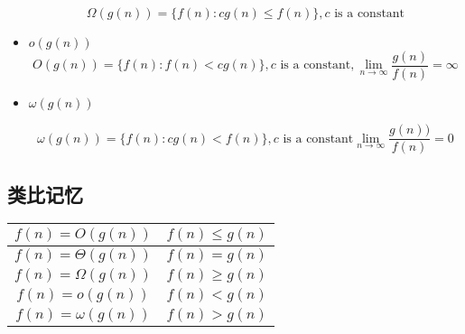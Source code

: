 \documentclass[11pt]{article}
\begin{document}
\begin{CJK}{UTF8}{gbsn}
\begin{itemize}
  \begin{displaymath}
    \Omega(g(n))=\{f(n):cg(n)\leqslant f(n) \},c\mbox{ is a constant}
  \end{displaymath}
  
\item $o(g(n))$
  \begin{displaymath}
    O(g(n))=\{f(n): f(n) < c g(n)\},c\mbox{ is a constant}, \lim_{n\rightarrow \infty} \frac{g(n)}{f(n)}=\infty
  \end{displaymath}

  \item $\omega(g(n))$

  \begin{displaymath}
    \omega(g(n))=\{f(n):cg(n)< f(n) \},c\mbox{ is a constant} \lim_{n\rightarrow \infty} \frac{g(n))}{f(n)}=0
  \end{displaymath}
  
\end{itemize}

\subsection{类比记忆}


\begin{center}
  \begin{tabular}{|c|c|}
    \hline
    $f(n)=O(g(n))$ & $f(n)\leqslant g(n)$  \\\hline
    $f(n)=\Theta(g(n))$ & $f(n) = g(n)$  \\\hline
    $f(n)=\Omega(g(n))$ & $f(n) \geqslant  g(n)$  \\\hline
    $f(n)=o(g(n))$ & $f(n) < g(n) $ \\\hline
    $f(n)=\omega(g(n))$ & $f(n) > g(n)$ \\
    \hline
  \end{tabular}
\end{center}


\end{CJK}
\end{document}
